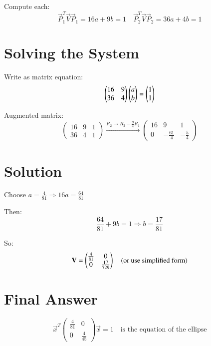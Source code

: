 \documentclass[journal]{IEEEtran}
\begin{document}
Compute each:
\[
\vec{P}_1^T \vec{V} \vec{P}_1 = 16a + 9b = 1
\quad
\vec{P}_2^T \vec{V} \vec{P}_2 = 36a + 4b = 1
\]

\section*{\large\textbf{Solving the System}}
\vspace{0.5cm}

Write as matrix equation:
\[
\begin{pmatrix}
16 & 9 \\
36 & 4
\end{pmatrix}
\begin{pmatrix}a \\ b\end{pmatrix}
=
\begin{pmatrix}1 \\ 1\end{pmatrix}
\]

Augmented matrix:
\[
\left(
\begin{array}{cc|c}
16 & 9 & 1 \\
36 & 4 & 1
\end{array}
\right)
\xrightarrow{R_2 \rightarrow R_2 - \frac{9}{4} R_1}
\left(
\begin{array}{cc|c}
16 & 9 & 1 \\
0 & -\frac{61}{4} & -\frac{5}{4}
\end{array}
\right)
\]

\section*{\large\textbf{Solution}}
\vspace{0.5cm}

Choose \( a = \frac{4}{81} \Rightarrow 16a = \frac{64}{81} \)

Then:
\[
\frac{64}{81} + 9b = 1
\Rightarrow b = \frac{17}{81}
\]

So:
\[
\mathbf{V} = \begin{pmatrix}\frac{4}{81} & 0 \\ 0 & \frac{17}{729}\end{pmatrix}
\quad \text{(or use simplified form)}
\]

\section*{\large\textbf{Final Answer}}
\vspace{0.5cm}

\[
\boxed{
\vec{x}^T
\begin{pmatrix}
\frac{4}{81} & 0 \\
0 & \frac{4}{45}
\end{pmatrix}
\vec{x} = 1
}
\quad \text{is the equation of the ellipse}
\]
\end{document}
